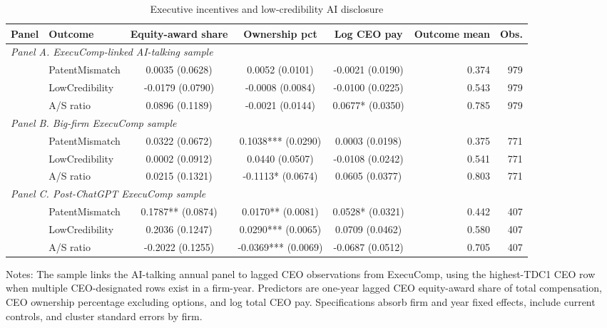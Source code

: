 \begin{table}[!htbp]
\centering
\caption{Executive incentives and low-credibility AI disclosure}
\small
\begin{tabular}{llcccrr}
\hline
Panel & Outcome & Equity-award share & Ownership pct & Log CEO pay & Outcome mean & Obs. \\
\hline
\multicolumn{7}{l}{\textit{Panel A. ExecuComp-linked AI-talking sample}} \\
 & PatentMismatch & 0.0035 (0.0628) & 0.0052 (0.0101) & -0.0021 (0.0190) & 0.374 & 979 \\
 & LowCredibility & -0.0179 (0.0790) & -0.0008 (0.0084) & -0.0100 (0.0225) & 0.543 & 979 \\
 & A/S ratio & 0.0896 (0.1189) & -0.0021 (0.0144) & 0.0677* (0.0350) & 0.785 & 979 \\
\multicolumn{7}{l}{\textit{Panel B. Big-firm ExecuComp sample}} \\
 & PatentMismatch & 0.0322 (0.0672) & 0.1038*** (0.0290) & 0.0003 (0.0198) & 0.375 & 771 \\
 & LowCredibility & 0.0002 (0.0912) & 0.0440 (0.0507) & -0.0108 (0.0242) & 0.541 & 771 \\
 & A/S ratio & 0.0215 (0.1321) & -0.1113* (0.0674) & 0.0605 (0.0377) & 0.803 & 771 \\
\multicolumn{7}{l}{\textit{Panel C. Post-ChatGPT ExecuComp sample}} \\
 & PatentMismatch & 0.1787** (0.0874) & 0.0170** (0.0081) & 0.0528* (0.0321) & 0.442 & 407 \\
 & LowCredibility & 0.2036 (0.1247) & 0.0290*** (0.0065) & 0.0709 (0.0462) & 0.580 & 407 \\
 & A/S ratio & -0.2022 (0.1255) & -0.0369*** (0.0069) & -0.0687 (0.0512) & 0.705 & 407 \\
\hline
\end{tabular}
\begin{flushleft}
\footnotesize Notes: The sample links the AI-talking annual panel to lagged CEO observations from ExecuComp, using the highest-TDC1 CEO row when multiple CEO-designated rows exist in a firm-year. Predictors are one-year lagged CEO equity-award share of total compensation, CEO ownership percentage excluding options, and log total CEO pay. Specifications absorb firm and year fixed effects, include current controls, and cluster standard errors by firm.
\end{flushleft}
\end{table}

